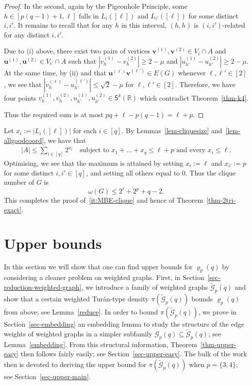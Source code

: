 \documentclass[10pt,a4paper]{article}
\newcommand{\V}[1]{\mathbold{#1}}
\theoremstyle{definition}
\newcommand{\cG}{\mathcal{G}}
\newcommand{\sS}{\mathsf{S}}
\begin{document}
\begin{proof}
	In the second, again by the Pigeonhole Principle, some $h\in [p(q-1)+1,\ell]$ falls in $L_i([\ell])$ and $L_{i'}([\ell])$ for some distinct $i,i'$. It remains to recall that for any $h$ in this interval, $(h,h)$ is $(i,i')$-related for any distinct $i,i'$.
	
	Due to (i) above, there exist two pairs of vertices $\V{v}^{(1)},\V{v}^{(2)}\in V_{i}\cap A$ and $\V{u}^{(1)},\V{u}^{(2)}\in V_{i'}\cap A$ such that $|v^{(1)}_{h} - v^{(2)}_{h}|\ge 2-\mu$ and $|u^{(1)}_{h'} - u^{(2)}_{h'}|\ge 2-\mu$. At the same time, by (ii) and that $\V{u}^{(\ell)}\V{v}^{(\ell')} \in E(G)$ whenever $\ell,\ell' \in [2]$, we see that 
	$|v^{(\ell)}_h-u^{(\ell')}_{h'}| \leq \sqrt{2}-\mu$ for $\ell,\ell' \in [2]$.
	Therefore, we have four points $v^{(1)}_{h},v^{(2)}_{h},u^{(1)}_{h'},u^{(2)}_{h'}\in \sS^k(\mathbb{R})$ which contradict Theorem~\ref{thm-k4}.
	
	Thus the required sum is at most $pq+\ell-p(q-1) = \ell+p$.
\end{proof}

Let $x_i := |L_i([\ell])|$ for each $i \in [q]$.
By Lemmas~\ref{lem-cliquesize} and~\ref{lem-allgoodcoord}, we have that
\begin{align*}
|A|\le \sum_{i\in [q]}2^{x_i}\quad \text{subject to }x_1+\ldots+x_q \leq \ell +p \text{ and every }x_i \leq \ell.
\end{align*}
Optimising, we see that the maximum is attained by setting $x_i:=\ell$ and $x_{i'}:=p$ for some distinct $i,i' \in [q]$, and setting all others equal to $0$.
Thus the clique number of $G$ is
$$
\omega(G) \leq 2^\ell+2^p+q-2.
$$
This completes the proof of~\ref{it:MBE-clique} and hence of Theorem~\ref{thm-2tri-exact}.





\section{Upper bounds}\label{sec-UB}

In this section we will show that one can find upper bounds for $\varrho_p(q)$ by considering a cleaner problem on weighted graphs. First, in Section~\ref{sec-reduction-weighted-graph}, we introduce a family of weighted graphs $\widetilde{\cG}_p(q)$ and show that a certain weighted Tur\'an-type density $\pi(\widetilde{\cG}_p(q))$ bounds $\varrho_p(q)$ from above; see Lemma~\ref{reduce}. In order to bound $\pi(\widetilde{\cG}_p(q))$, we prove in Section~\ref{sec-embedding} an embedding lemma to study the structure of the edge weights of weighted graphs in a simpler subfamily $\cG_p(q) \subseteq \widetilde{\cG}_p(q)$; see Lemma~\ref{embedding}. From this structural information, Theorem~\ref{thm-upper-easy} then follows fairly easily; see Section~\ref{sec-upper-easy}.
The bulk of the work then is devoted to deriving the upper bound for $\pi(\widetilde{\cG}_p(q))$ when $p=\{3,4\}$; see Section~\ref{sec-upper-main}.
\end{document}
